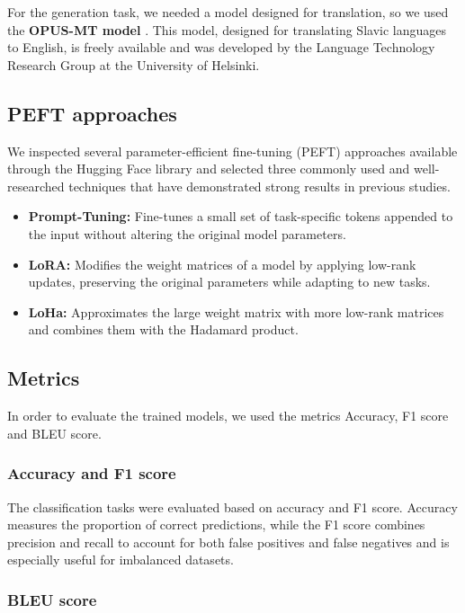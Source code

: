 \documentclass[fleqn,moreauthors,10pt]{ds_report}
\begin{document}
    For the generation task, we needed a model designed for translation, so we used the \textbf{OPUS-MT model} \cite{huggingfaceHelsinkiNLPopusmtslaenHugging}. This model, designed for translating Slavic languages to English, is freely available and was developed by the Language Technology Research Group at the University of Helsinki.

    \subsection*{PEFT approaches}
    
    We inspected several parameter-efficient fine-tuning (PEFT) approaches available through the Hugging Face library and selected three commonly used and well-researched techniques that have demonstrated strong results in previous studies.
    
    \begin{itemize}
        \item \textbf{Prompt-Tuning:} Fine-tunes a small set of task-specific tokens appended to the input without altering the original model parameters.
        \item \textbf{LoRA:} Modifies the weight matrices of a model by applying low-rank updates, preserving the original parameters while adapting to new tasks.
        \item \textbf{LoHa:} Approximates the large weight matrix with more low-rank matrices and combines them with the Hadamard product.
     \end{itemize}
    
    \subsection*{Metrics}
    In order to evaluate the trained models, we used the metrics Accuracy, F1 score and BLEU score.

    \subsubsection*{Accuracy and F1 score}
        
        The classification tasks were evaluated based on accuracy and F1 score. Accuracy measures the proportion of correct predictions, while the F1 score combines precision and recall to account for both false positives and false negatives and is especially useful for imbalanced datasets.

    \subsubsection*{BLEU score}
\end{document}
